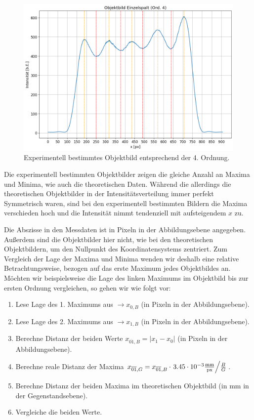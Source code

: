 \begin{figure}[H]
  \centering
  \includegraphics[width=.9\textwidth]{files/plots/4/es_praxis_objektbild_ord4.png}
  \caption{Experimentell bestimmtes Objektbild entsprechend der 4. Ordnung.}
  \label{fig:es_praxis_objektbild_ord4}
\end{figure}

Die experimentell bestimmten Objektbilder zeigen die gleiche Anzahl an Maxima und Minima, wie auch die theoretischen Daten. Während die allerdings die theoretischen Objektbilder in der Intensitätsverteilung immer perfekt Symmetrisch waren, sind bei den experimentell bestimmten Bildern die Maxima verschieden hoch und die Intensität nimmt tendenziell mit aufsteigendem $x$ zu.

Die Abszisse in den Messdaten ist in Pixeln in der Abbildungsebene angegeben. Außerdem sind die Objektbilder hier nicht, wie bei den theoretischen Objektbildern, um den Nullpunkt des Koordinatensystems zentriert. Zum Vergleich der Lage der Maxima und Minima wenden wir deshalb eine relative Betrachtungsweise, bezogen auf das erste Maximum jedes Objektbildes an. Möchten wir beispielsweise die Lage des linken Maximums im Objektbild bis zur ersten Ordnung vergleichen, so gehen wir wie folgt vor:
\begin{enumerate}[label=\arabic*.)]
  \item Lese Lage des 1. Maximums aus $\to x_{0, B}$ (in Pixeln in der Abbildungsebene).
  \item Lese Lage des 2. Maximums aus $\to x_{1, B}$ (in Pixeln in der Abbildungsebene).
  \item Berechne Distanz der beiden Werte $x_{\overline{01}, B} = |x_{1} - x_{0}|$ (in Pixeln in der Abbildungsebene).
  \item Berechne reale Distanz der Maxima $x_{\overline{01}, G} = x_{\overline{01}, B} \cdot \ffrac{3.45 \cdot 10^{-3} \frac{\si{\milli\meter}}{\mathrm{px}}}{\frac{B}{G}}$.
  \item Berechne Distanz der beiden Maxima im theoretischen Objektbild (in $\si{\milli\meter}$ in der Gegenstandsebene).
  \item Vergleiche die beiden Werte.
\end{enumerate} 

